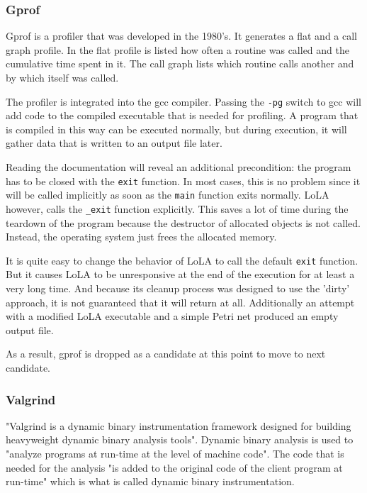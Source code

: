 \subsubsection{Gprof}
Gprof is a profiler that was developed in the 1980's. It generates a flat and a call graph profile\cite{graham1982gprof}. In the flat profile is listed how often a routine was called and the cumulative time spent in it. The call graph lists which routine calls another and by which itself was called.

The profiler is integrated into the gcc compiler. Passing the \texttt{-pg} switch to gcc will add code to the compiled executable that is needed for profiling. A program that is compiled in this way can be executed normally, but during execution, it will gather data that is written to an output file later.

Reading the documentation will reveal an additional precondition: the program has to be closed with the \texttt{exit} function. In most cases, this is no problem since it will be called implicitly as soon as the \texttt{main} function exits normally. LoLA however, calls the \texttt{\_exit} function explicitly. This saves a lot of time during the teardown of the program because the destructor of allocated objects is not called. Instead, the operating system just frees the allocated memory.

It is quite easy to change the behavior of LoLA to call the default \texttt{exit} function. But it causes LoLA to be unresponsive at the end of the execution for at least a very long time. And because its cleanup process was designed to use the 'dirty' approach, it is not guaranteed that it will return at all. Additionally an attempt with a modified LoLA executable and a simple Petri net produced an empty output file.

As a result, gprof is dropped as a candidate at this point to move to next candidate.

\subsubsection{Valgrind}
"Valgrind is a dynamic binary instrumentation framework designed for building heavyweight dynamic binary analysis tools"\cite{nethercote2007valgrind}. Dynamic binary analysis is used to "analyze programs at run-time at the level of machine code". The code that is needed for the analysis "is added to the original code of the client program at run-time" which is what is called dynamic binary instrumentation.

